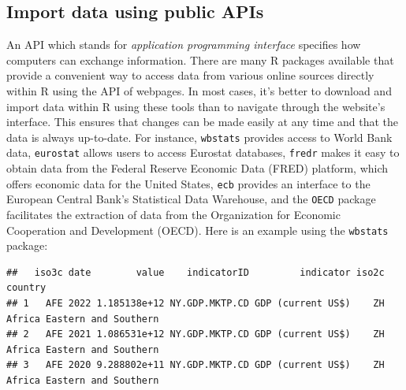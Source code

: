 \documentclass[
  12pt,
  oneside]{book}
\newenvironment{Shaded}{\begin{snugshade}}{\end{snugshade}}
\newcommand{\AttributeTok}[1]{\textcolor[rgb]{0.13,0.29,0.53}{#1}}
\newcommand{\CommentTok}[1]{\textcolor[rgb]{0.56,0.35,0.01}{\textit{#1}}}
\newcommand{\DecValTok}[1]{\textcolor[rgb]{0.00,0.00,0.81}{#1}}
\newcommand{\FunctionTok}[1]{\textcolor[rgb]{0.13,0.29,0.53}{\textbf{#1}}}
\newcommand{\NormalTok}[1]{#1}
\newcommand{\OtherTok}[1]{\textcolor[rgb]{0.56,0.35,0.01}{#1}}
\newcommand{\StringTok}[1]{\textcolor[rgb]{0.31,0.60,0.02}{#1}}
\begin{document}
\hypertarget{import-data-using-public-apis}{%
\subsection{Import data using public APIs}\label{import-data-using-public-apis}}

An API which stands for \emph{application programming interface} specifies how computers can exchange information. There are many R packages available that provide a convenient way to access data from various online sources directly within R using the API of webpages. In most cases, it's better to download and import data within R using these tools than to navigate through the website's interface. This ensures that changes can be made easily at any time and that the data is always up-to-date. For instance, \texttt{wbstats} provides access to World Bank data, \texttt{eurostat} allows users to access Eurostat databases, \texttt{fredr} makes it easy to obtain data from the Federal Reserve Economic Data (FRED) platform, which offers economic data for the United States, \texttt{ecb} provides an interface to the European Central Bank's Statistical Data Warehouse, and the \texttt{OECD} package facilitates the extraction of data from the Organization for Economic Cooperation and Development (OECD). Here is an example using the \texttt{wbstats} package:

\begin{Shaded}
\end{Shaded}

\begin{verbatim}
##   iso3c date        value    indicatorID         indicator iso2c                     country
## 1   AFE 2022 1.185138e+12 NY.GDP.MKTP.CD GDP (current US$)    ZH Africa Eastern and Southern
## 2   AFE 2021 1.086531e+12 NY.GDP.MKTP.CD GDP (current US$)    ZH Africa Eastern and Southern
## 3   AFE 2020 9.288802e+11 NY.GDP.MKTP.CD GDP (current US$)    ZH Africa Eastern and Southern
\end{verbatim}
\end{document}
